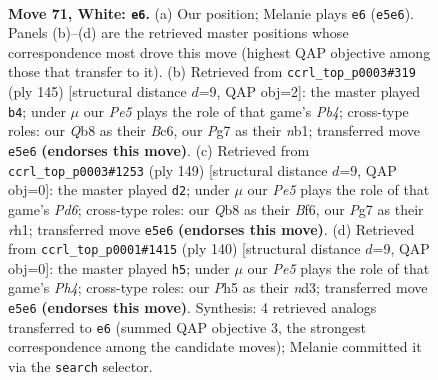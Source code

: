 \documentclass[11pt]{article}
\begin{document}
\clearpage

\begin{figure}[p]\centering
\begin{subfigure}{0.46\textwidth}\centering
\resizebox{\linewidth}{!}{%
\newchessgame
\chessboard[
  setfen={1Q6/6P1/8/2k1P2P/8/8/2K5/8 w - - 1 71},
  showmover=false,
  pgfstyle=straightmove, color=movearrow, markmove={e5-e6}
]}
\caption{}
\end{subfigure}\hfill
\begin{subfigure}{0.46\textwidth}\centering
\resizebox{\linewidth}{!}{%
\newchessgame
\chessboard[
  setfen={8/5k2/2b5/pp6/3K4/8/8/1N6 b - - 1 73},
  showmover=false,
  pgfstyle=straightmove, color=movearrow, markmove={b5-b4}
]}
\caption{}
\end{subfigure}
\\[4pt]
\begin{subfigure}{0.46\textwidth}\centering
\resizebox{\linewidth}{!}{%
\newchessgame
\chessboard[
  setfen={8/8/5bp1/8/4k3/3p4/5K2/7R b - - 5 75},
  showmover=false,
  pgfstyle=straightmove, color=movearrow, markmove={d3-d2}
]}
\caption{}
\end{subfigure}\hfill
\begin{subfigure}{0.46\textwidth}\centering
\resizebox{\linewidth}{!}{%
\newchessgame
\chessboard[
  setfen={8/8/5k2/8/6KP/3nP3/8/8 w - - 3 71},
  showmover=false,
  pgfstyle=straightmove, color=movearrow, markmove={h4-h5}
]}
\caption{}
\end{subfigure}
\caption{\textbf{Move 71, White: \texttt{e6}.} (a) Our position; Melanie plays \texttt{e6} (\texttt{e5e6}). Panels (b)--(d) are the retrieved master positions whose correspondence most drove this move (highest QAP objective among those that transfer to it). (b) Retrieved from \texttt{ccrl\_top\_p0003\#319} (ply 145) [structural distance $d$=9, QAP obj=2]: the master played \texttt{b4}; under $\mu$ our \emph{Pe5} plays the role of that game's \emph{Pb4}; cross-type roles: our \emph{Q}b8 as their \emph{B}c6, our \emph{P}g7 as their \emph{n}b1; transferred move \texttt{e5e6} \textbf{(endorses this move)}. (c) Retrieved from \texttt{ccrl\_top\_p0003\#1253} (ply 149) [structural distance $d$=9, QAP obj=0]: the master played \texttt{d2}; under $\mu$ our \emph{Pe5} plays the role of that game's \emph{Pd6}; cross-type roles: our \emph{Q}b8 as their \emph{B}f6, our \emph{P}g7 as their \emph{r}h1; transferred move \texttt{e5e6} \textbf{(endorses this move)}. (d) Retrieved from \texttt{ccrl\_top\_p0001\#1415} (ply 140) [structural distance $d$=9, QAP obj=0]: the master played \texttt{h5}; under $\mu$ our \emph{Pe5} plays the role of that game's \emph{Ph4}; cross-type roles: our \emph{P}h5 as their \emph{n}d3; transferred move \texttt{e5e6} \textbf{(endorses this move)}. Synthesis: 4 retrieved analogs transferred to \texttt{e6} (summed QAP objective 3, the strongest correspondence among the candidate moves); Melanie committed it via the \texttt{search} selector.}
\label{fig:thought-m140}
\end{figure}
\end{document}
